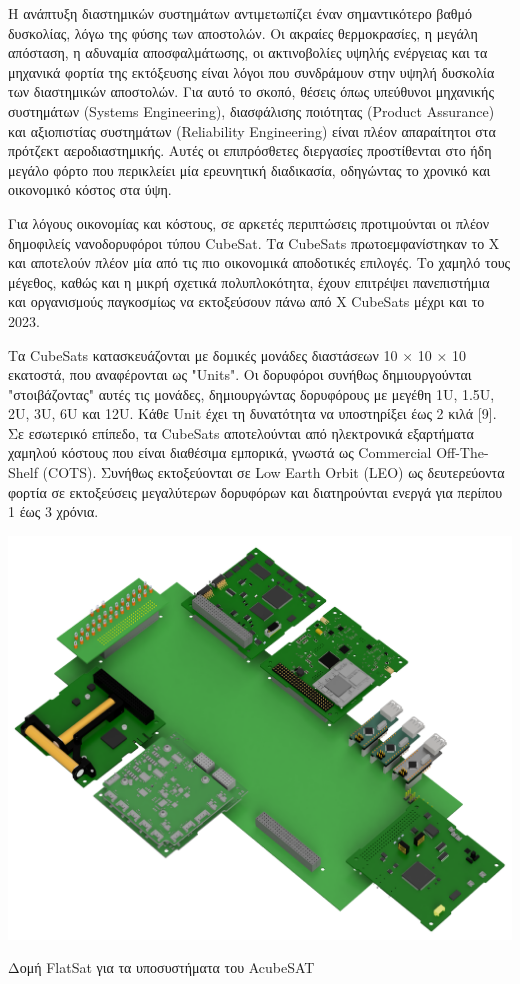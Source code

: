 \documentclass[a4paper,nobib,justified]{tufte-book}
\begin{document}
Η ανάπτυξη διαστημικών συστημάτων αντιμετωπίζει έναν σημαντικότερο βαθμό δυσκολίας, λόγω της φύσης των αποστολών. Οι ακραίες θερμοκρασίες, η μεγάλη απόσταση, η αδυναμία αποσφαλμάτωσης, οι ακτινοβολίες υψηλής ενέργειας και τα μηχανικά φορτία της εκτόξευσης είναι λόγοι που συνδράμουν στην υψηλή δυσκολία των διαστημικών αποστολών. Για αυτό το σκοπό, θέσεις όπως υπεύθυνοι μηχανικής συστημάτων (Systems Engineering), διασφάλισης ποιότητας (Product Assurance) και αξιοπιστίας συστημάτων (Reliability Engineering) είναι πλέον απαραίτητοι στα πρότζεκτ αεροδιαστημικής. Αυτές οι επιπρόσθετες διεργασίες προστίθενται στο ήδη μεγάλο φόρτο που περικλείει μία ερευνητική διαδικασία, οδηγώντας το χρονικό και οικονομικό κόστος στα ύψη.

Για λόγους οικονομίας και κόστους, σε αρκετές περιπτώσεις προτιμούνται οι πλέον δημοφιλείς νανοδορυφόροι τύπου CubeSat. Τα CubeSats πρωτοεμφανίστηκαν το Χ και αποτελούν πλέον μία από τις πιο οικονομικά αποδοτικές επιλογές. Το χαμηλό τους μέγεθος, καθώς και η μικρή σχετικά πολυπλοκότητα, έχουν επιτρέψει πανεπιστήμια και οργανισμούς παγκοσμίως να εκτοξεύσουν πάνω από X CubeSats μέχρι και το 2023.


Τα CubeSats κατασκευάζονται με δομικές μονάδες διαστάσεων 10 × 10 × 10 εκατοστά, που αναφέρονται ως "Units". Οι δορυφόροι συνήθως δημιουργούνται "στοιβάζοντας" αυτές τις μονάδες, δημιουργώντας δορυφόρους με μεγέθη 1U, 1.5U, 2U, 3U, 6U και 12U. Κάθε Unit έχει τη δυνατότητα να υποστηρίξει έως 2 κιλά [9]. Σε εσωτερικό επίπεδο, τα CubeSats αποτελούνται από ηλεκτρονικά εξαρτήματα χαμηλού κόστους που είναι διαθέσιμα εμπορικά, γνωστά ως Commercial Off-The-Shelf (COTS). Συνήθως εκτοξεύονται σε Low Earth Orbit (LEO) ως δευτερεύοντα φορτία σε εκτοξεύσεις μεγαλύτερων δορυφόρων και διατηρούνται ενεργά για περίπου 1 έως 3 χρόνια.
\begin{marginfigure}
	\includegraphics{media/images/flatsat.png}
	\label{fig:flatsat}
	\caption{Δομή FlatSat για τα υποσυστήματα του AcubeSAT}
\end{marginfigure}
\end{document}
